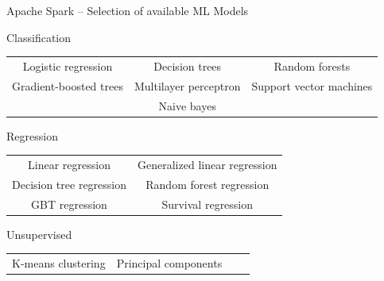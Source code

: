 \documentclass[ignorenonframetext,xcolor=x11names]{beamer}
\begin{document}
\begin{frame}[label=advanced]{Apache Spark -- Selection of available ML Models}
\begin{block}{\small Classification}
\begin{center}
\renewcommand{\arraystretch}{1.5}
\footnotesize
\begin{tabular}{ccc} 
Logistic regression & Decision trees & Random forests \\
Gradient-boosted trees & Multilayer perceptron & Support vector machines \\
& Naive bayes
\end{tabular}
\end{center}
\end{block}
\begin{block}{\small Regression}
\begin{center}
\renewcommand{\arraystretch}{1.5}
\footnotesize
\begin{tabular}{cc} 
Linear regression & Generalized linear regression \\
Decision tree regression & Random forest regression \\
GBT regression & Survival regression \\
\end{tabular}
\end{center}
\end{block}
\begin{block}{\small Unsupervised}
\begin{center}
\renewcommand{\arraystretch}{1.5}
\footnotesize
\begin{tabular}{cccc} 
K-means clustering & Principal components \\
\end{tabular}
\end{center}
\end{block}
\end{frame}


\end{document}
